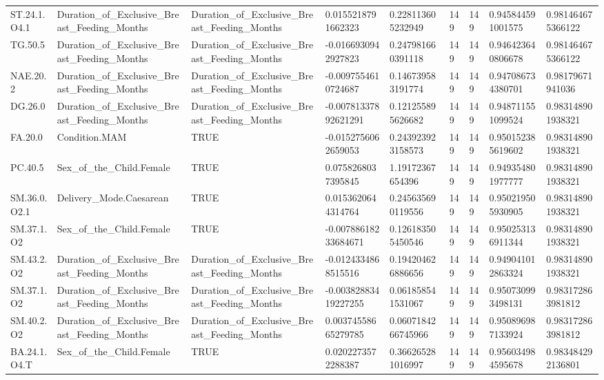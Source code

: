 \begin{longtable}{lllllllll}
ST.24.1.O4.1 & Duration\_of\_Exclusive\_Breast\_Feeding\_Months & Duration\_of\_Exclusive\_Breast\_Feeding\_Months & 0.0155218791662323 & 0.228113605232949 & 149 & 149 & 0.945844591001575 & 0.981464675366122 \\
TG.50.5 & Duration\_of\_Exclusive\_Breast\_Feeding\_Months & Duration\_of\_Exclusive\_Breast\_Feeding\_Months & -0.0166930942927823 & 0.247981660391118 & 149 & 149 & 0.946423640806678 & 0.981464675366122 \\
NAE.20.2 & Duration\_of\_Exclusive\_Breast\_Feeding\_Months & Duration\_of\_Exclusive\_Breast\_Feeding\_Months & -0.0097554610724687 & 0.146739583191774 & 149 & 149 & 0.947086734380701 & 0.98179671941036 \\
DG.26.0 & Duration\_of\_Exclusive\_Breast\_Feeding\_Months & Duration\_of\_Exclusive\_Breast\_Feeding\_Months & -0.00781337892621291 & 0.121255895626682 & 149 & 149 & 0.948711551099524 & 0.983148901938321 \\
FA.20.0 & Condition.MAM & TRUE & -0.0152756062659053 & 0.243923923158573 & 149 & 149 & 0.950152385619602 & 0.983148901938321 \\
PC.40.5 & Sex\_of\_the\_Child.Female & TRUE & 0.0758268037395845 & 1.19172367654396 & 149 & 149 & 0.949354801977777 & 0.983148901938321 \\
SM.36.0.O2.1 & Delivery\_Mode.Caesarean & TRUE & 0.0153620644314764 & 0.245635690119556 & 149 & 149 & 0.950219505930905 & 0.983148901938321 \\
SM.37.1.O2 & Sex\_of\_the\_Child.Female & TRUE & -0.00788618233684671 & 0.126183505450546 & 149 & 149 & 0.950253136911344 & 0.983148901938321 \\
SM.43.2.O2 & Duration\_of\_Exclusive\_Breast\_Feeding\_Months & Duration\_of\_Exclusive\_Breast\_Feeding\_Months & -0.0124334868515516 & 0.194204626886656 & 149 & 149 & 0.949041012863324 & 0.983148901938321 \\
SM.37.1.O2 & Duration\_of\_Exclusive\_Breast\_Feeding\_Months & Duration\_of\_Exclusive\_Breast\_Feeding\_Months & -0.00382883419227255 & 0.061858541531067 & 149 & 149 & 0.950730993498131 & 0.983172863981812 \\
SM.40.2.O2 & Duration\_of\_Exclusive\_Breast\_Feeding\_Months & Duration\_of\_Exclusive\_Breast\_Feeding\_Months & 0.00374558665279785 & 0.0607184266745966 & 149 & 149 & 0.950896987133924 & 0.983172863981812 \\
BA.24.1.O4.T & Sex\_of\_the\_Child.Female & TRUE & 0.0202273572288387 & 0.366265281016997 & 149 & 149 & 0.956034984595678 & 0.983484292136801 \\

\end{longtable}
